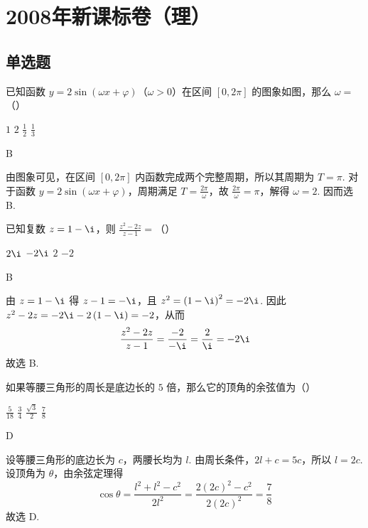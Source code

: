 \chapter{2008年新课标卷（理）}

\section{单选题}

\begin{problem}
已知函数 \(y = 2\sin (\omega x + \varphi)\)（\(\omega > 0\)）在区间 \([0, 2\pi]\) 的图象如图，那么 \(\omega =\)（\quad）


\choices
    {\(1\)}
    {\(2\)}
    {\(\frac{1}{2}\)}
    {\(\frac{1}{3}\)}
\begin{answer}
B
\end{answer}

\begin{solution}
由图象可见，在区间 \([0,2\pi]\) 内函数完成两个完整周期，所以其周期为 \(T=\pi\). 对于函数 \(y=2\sin(\omega x+\varphi)\)，周期满足 \(T=\frac{2\pi}{\omega}\)，故 \(\frac{2\pi}{\omega}=\pi\)，解得 \(\omega=2\). 因而选 B.
\end{solution}
\end{problem}

\begin{problem}
已知复数 \(z = 1 - \i\)，则 \(\frac{z^2 - 2z}{z - 1} =\)（\quad）

\choices
    {\(2\i\)}
    {\(-2\i\)}
    {\(2\)}
    {\(-2\)}
\begin{answer}
B
\end{answer}

\begin{solution}
由 \(z=1-\i\) 得 \(z-1=-\i\)，且
\(z^2=\left(1-\i\right)^2=-2\i\). 因此
\(z^2-2z=-2\i-2\left(1-\i\right)=-2\)，从而
\[
\frac{z^2-2z}{z-1}=\frac{-2}{-\i}=\frac{2}{\i}=-2\i
\]
故选 B.
\end{solution}
\end{problem}

\begin{problem}
如果等腰三角形的周长是底边长的 \(5\) 倍，那么它的顶角的余弦值为（\quad）

\choices
    {\(\frac{5}{18}\)}
    {\(\frac{3}{4}\)}
    {\(\frac{\sqrt{3}}{2}\)}
    {\(\frac{7}{8}\)}
\begin{answer}
D
\end{answer}

\begin{solution}
设等腰三角形的底边长为 \(c\)，两腰长均为 \(l\). 由周长条件，\(2l+c=5c\)，所以 \(l=2c\). 设顶角为 \(\theta\)，由余弦定理得
\[
\cos\theta=\frac{l^2+l^2-c^2}{2l^2}=\frac{2\left(2c\right)^2-c^2}{2\left(2c\right)^2}=\frac{7}{8}
\]
故选 D.
\end{solution}
\end{problem}

